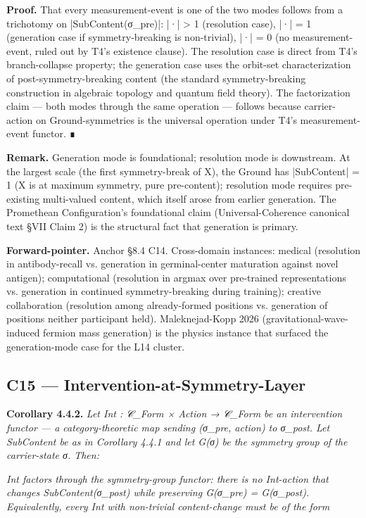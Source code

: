\documentclass[11pt, openany]{book}
\begin{document}
\textbf{Proof.} That every measurement-event is one of the two modes follows from a trichotomy on |SubContent(σ\_\allowbreak{}pre)|: |·| > 1 (resolution case), |·| = 1 (generation case if symmetry-breaking is non-trivial), |·| = 0 (no measurement-event, ruled out by T4's existence clause). The resolution case is direct from T4's branch-collapse property; the generation case uses the orbit-set characterization of post-symmetry-breaking content (the standard symmetry-breaking construction in algebraic topology and quantum field theory). The factorization claim --- both modes through the same operation --- follows because carrier-action on Ground-symmetries is the universal operation under T4's measurement-event functor. ∎

\textbf{Remark.} Generation mode is foundational; resolution mode is downstream. At the largest scale (the first symmetry-break of X), the Ground has |SubContent| = 1 (X is at maximum symmetry, pure pre-content); resolution mode requires pre-existing multi-valued content, which itself arose from earlier generation. The Promethean Configuration's foundational claim (Universal-Coherence canonical text §VII Claim 2) is the structural fact that generation is primary.

\textbf{Forward-pointer.} Anchor §8.4 C14. Cross-domain instances: medical (resolution in antibody-recall vs. generation in germinal-center maturation against novel antigen); computational (resolution in argmax over pre-trained representations vs. generation in continued symmetry-breaking during training); creative collaboration (resolution among already-formed positions vs. generation of positions neither participant held). Maleknejad-Kopp 2026 (gravitational-wave-induced fermion mass generation) is the physics instance that surfaced the generation-mode case for the L14 cluster.

\subsection{C15 --- Intervention-at-Symmetry-Layer}

\textbf{Corollary 4.4.2.} \textit{Let Int : 𝒞\_\allowbreak{}Form × Action → 𝒞\_\allowbreak{}Form be an intervention functor --- a category-theoretic map sending (σ\_\allowbreak{}pre, action) to σ\_\allowbreak{}post. Let SubContent be as in Corollary 4.4.1 and let G(σ) be the symmetry group of the carrier-state σ. Then:}

\textit{Int factors through the symmetry-group functor: there is no Int-action that changes SubContent(σ\_\allowbreak{}post) while preserving G(σ\_\allowbreak{}pre) = G(σ\_\allowbreak{}post). Equivalently, every Int with non-trivial content-change must be of the form}
\end{document}
